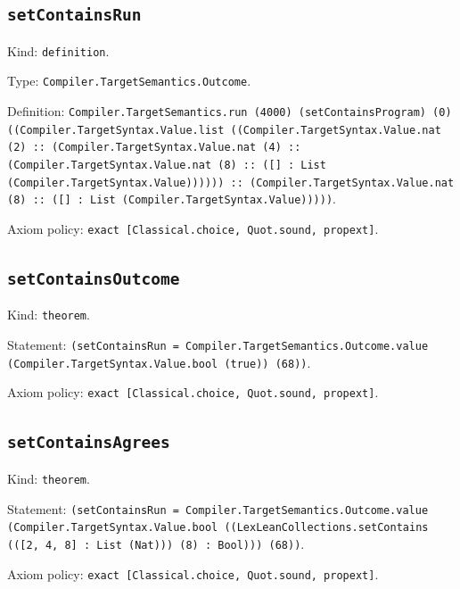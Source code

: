 \documentclass[11pt]{article}
\begin{document}
\subsection*{\texttt{setContainsRun}}
\noindent Kind: \texttt{definition}.\par
\noindent Type: \texttt{Compiler.TargetSemantics.Outcome}.\par
\noindent Definition: \texttt{Compiler.TargetSemantics.run (4000) (setContainsProgram) (0) ((Compiler.TargetSyntax.Value.list ((Compiler.TargetSyntax.Value.nat (2) :: (Compiler.TargetSyntax.Value.nat (4) :: (Compiler.TargetSyntax.Value.nat (8) :: ([] : List (Compiler.TargetSyntax.Value)))))) :: (Compiler.TargetSyntax.Value.nat (8) :: ([] : List (Compiler.TargetSyntax.Value)))))}.\par
\noindent Axiom policy: \texttt{exact [Classical.choice, Quot.sound, propext]}.\par
\subsection*{\texttt{setContainsOutcome}}
\noindent Kind: \texttt{theorem}.\par
\noindent Statement: \texttt{(setContainsRun = Compiler.TargetSemantics.Outcome.value (Compiler.TargetSyntax.Value.bool (true)) (68))}.\par
\noindent Axiom policy: \texttt{exact [Classical.choice, Quot.sound, propext]}.\par
\subsection*{\texttt{setContainsAgrees}}
\noindent Kind: \texttt{theorem}.\par
\noindent Statement: \texttt{(setContainsRun = Compiler.TargetSemantics.Outcome.value (Compiler.TargetSyntax.Value.bool ((LexLeanCollections.setContains (([2, 4, 8] : List (Nat))) (8) : Bool))) (68))}.\par
\noindent Axiom policy: \texttt{exact [Classical.choice, Quot.sound, propext]}.\par
\end{document}
